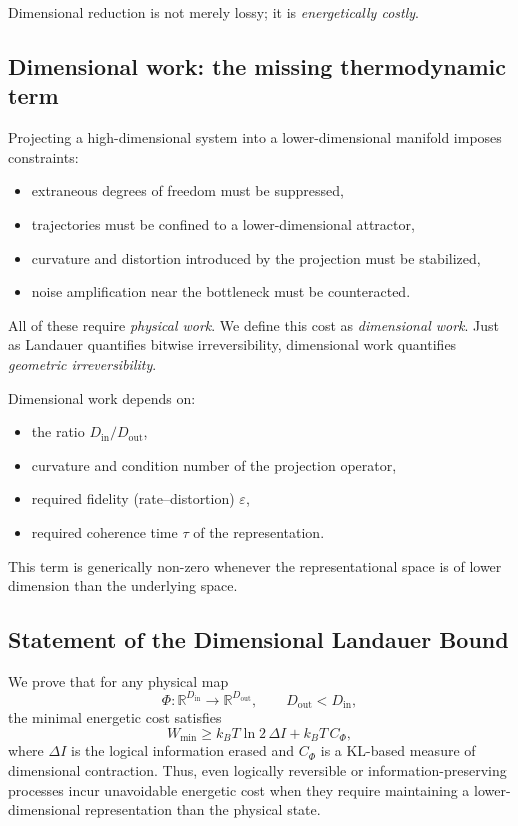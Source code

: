 \documentclass[12pt]{article}
\begin{document}
Dimensional reduction is not merely lossy; it is \emph{energetically costly}.

\subsection{Dimensional work: the missing thermodynamic term}

Projecting a high-dimensional system into a lower-dimensional manifold imposes constraints:
\begin{itemize}
\item extraneous degrees of freedom must be suppressed,
\item trajectories must be confined to a lower-dimensional attractor,
\item curvature and distortion introduced by the projection must be stabilized,
\item noise amplification near the bottleneck must be counteracted.
\end{itemize}
All of these require \emph{physical work}. We define this cost as \emph{dimensional work}. Just as Landauer quantifies bitwise irreversibility, dimensional work quantifies \emph{geometric irreversibility}.

Dimensional work depends on:
\begin{itemize}
\item the ratio $D_{\mathrm{in}} / D_{\mathrm{out}}$,
\item curvature and condition number of the projection operator,
\item required fidelity (rate--distortion) $\varepsilon$,
\item required coherence time $\tau$ of the representation.
\end{itemize}
This term is generically non-zero whenever the representational space is of lower dimension than the underlying space.

\subsection{Statement of the Dimensional Landauer Bound}

We prove that for any physical map
\[
\Phi: \mathbb{R}^{D_\mathrm{in}} \rightarrow \mathbb{R}^{D_\mathrm{out}}
,\qquad D_\mathrm{out} < D_\mathrm{in},
\]
the minimal energetic cost satisfies
\begin{equation}
W_{\min} \ge k_B T \ln 2\, \Delta I + k_B T\, C_\Phi,
\label{eq:dim_landauer_core}
\end{equation}
where $\Delta I$ is the logical information erased and $C_\Phi$ is a KL-based measure of dimensional contraction. Thus, even logically reversible or information-preserving processes incur unavoidable energetic cost when they require maintaining a lower-dimensional representation than the physical state.
\end{document}
